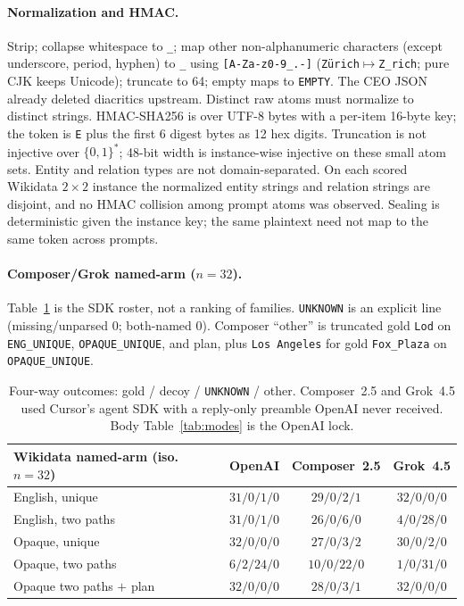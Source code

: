 \documentclass[10pt]{article} %
\begin{document}
\paragraph{Normalization and HMAC.}
Strip; collapse whitespace to \texttt{\_}; map other non-alphanumeric
characters (except underscore, period, hyphen) to \texttt{\_} using
\verb|[A-Za-z0-9_.-]| (\texttt{Z\"{u}rich}$\mapsto$\texttt{Z\_rich}; pure
CJK keeps Unicode); truncate to 64; empty maps to \texttt{EMPTY}.
The CEO JSON already deleted diacritics upstream. Distinct raw atoms must
normalize to distinct strings. HMAC-SHA256 is over UTF-8 bytes with a
per-item 16-byte key; the token is \texttt{E} plus the first 6 digest bytes
as 12 hex digits. Truncation is not injective over $\{0,1\}^{\ast}$;
48-bit width is instance-wise injective on these small atom sets.
Entity and relation types are not domain-separated. On each scored
Wikidata $2{\times}2$ instance the normalized entity strings and relation
strings are disjoint, and no HMAC collision among prompt atoms was
observed. Sealing is deterministic given the instance key; the same
plaintext need not map to the same token across prompts.

\paragraph{Composer/Grok named-arm ($n{=}32$).}
Table~\ref{tab:threeway} is the SDK roster, not a ranking of families.
\texttt{UNKNOWN} is an explicit line (missing/unparsed $0$; both-named $0$).
Composer ``other'' is truncated gold \texttt{Lod} on
\texttt{ENG\_UNIQUE}, \texttt{OPAQUE\_UNIQUE}, and plan, plus
\texttt{Los Angeles} for gold \texttt{Fox\_Plaza} on
\texttt{OPAQUE\_UNIQUE}.

\begin{table}[htbp]
\centering
\small
\setlength{\tabcolsep}{3.5pt}

\caption{Four-way outcomes: gold / decoy / \texttt{UNKNOWN} / other.
Composer~2.5 and Grok~4.5 used Cursor's agent SDK with a reply-only preamble
OpenAI never received. Body Table~\ref{tab:modes} is the OpenAI lock.}
\label{tab:threeway}
\begin{tabular}{@{}lccc@{}}
\toprule
Wikidata named-arm (iso.\ $n{=}32$) & OpenAI & Composer~2.5 & Grok~4.5 \\
\midrule
English, unique & $31/0/1/0$ & $29/0/2/1$ & $32/0/0/0$ \\
English, two paths & $31/0/1/0$ & $26/0/6/0$ & $4/0/28/0$ \\
Opaque, unique & $32/0/0/0$ & $27/0/3/2$ & $30/0/2/0$ \\
Opaque, two paths & $6/2/24/0$ & $10/0/22/0$ & $1/0/31/0$ \\
Opaque two paths $+$ plan & $32/0/0/0$ & $28/0/3/1$ & $32/0/0/0$ \\
\bottomrule
\end{tabular}

\end{table}
\end{document}

